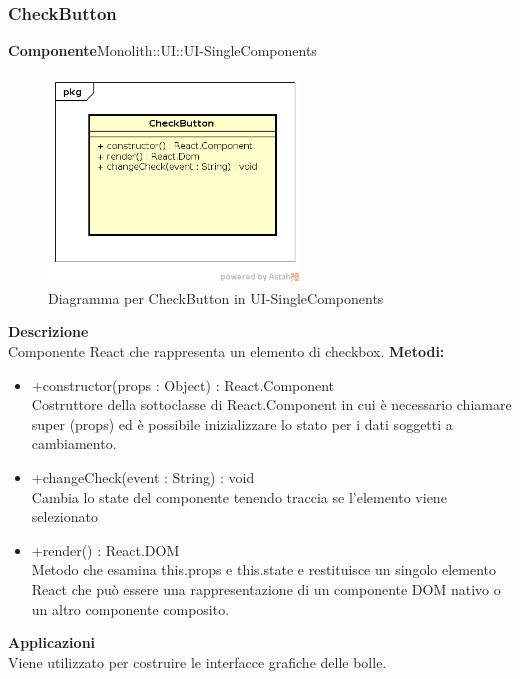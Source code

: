 \subsubsection{CheckButton}
\textbf{Componente}Monolith::UI::UI-SingleComponents\\
   \FloatBarrier
   \begin{figure}[ht]
   \centering
   \includegraphics[width=0.6\textwidth]{img/single-CheckButton}
   \caption{{Diagramma per CheckButton in UI-SingleComponents}}
\end{figure}
\FloatBarrier
\textbf{Descrizione}\\
Componente React che rappresenta un elemento di checkbox.
\textbf{Metodi:} \begin{itemize}\item +constructor(props : Object) : React.Component \\Costruttore della sottoclasse di React.Component in cui è necessario chiamare super (props) ed è possibile inizializzare lo stato per i dati soggetti a cambiamento.\item +changeCheck(event : String) : void  \\Cambia lo state del componente tenendo traccia se l'elemento viene selezionato \item +render() : React.DOM \\Metodo che esamina this.props e this.state e restituisce un singolo elemento React che può essere una rappresentazione di un componente DOM nativo o un altro componente composito.\end{itemize} 


\textbf{Applicazioni}\\
Viene utilizzato per costruire le interfacce grafiche delle bolle. 


\clearpage

